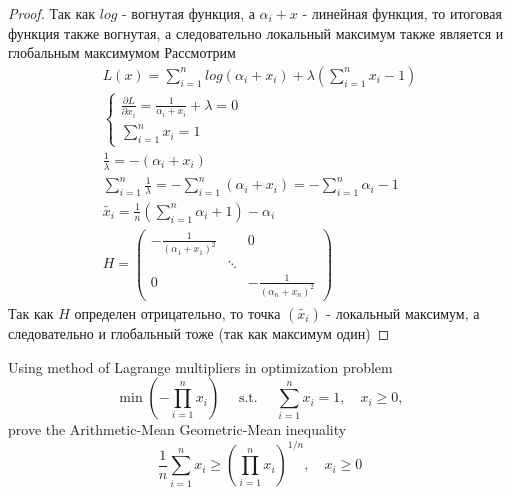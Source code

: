 \begin{proof}
    Так как $log$ - вогнутая функция, а $\alpha_i + x$ - линейная функция, то итоговая функция также вогнутая, а следовательно локальный максимум также является и глобальным максимумом
    Рассмотрим
    \begin{gather*}
        L(x) = \sum\limits_{i=1}^{n} log(\alpha_i + x_i) + \lambda (\sum\limits_{i=1}^{n} x_i - 1)\\
        \begin{cases}
            \frac{\partial L}{\partial x_i} = \frac{1}{\alpha_i + x_i} + \lambda = 0\\
            \sum\limits_{i = 1}^{n} x_i = 1
        \end{cases}\\
        \frac{1}{\lambda} = -(\alpha_i + x_i)\\
        \sum\limits_{i = 1}^{n} \frac{1}{\lambda}
        = -\sum\limits_{i = 1}^{n} (\alpha_i + x_i)
        = -\sum\limits_{i = 1}^{n} \alpha_i - 1\\
        \tilde{x_i} = \frac{1}{n}(\sum\limits_{i = 1}^{n} \alpha_i + 1) - \alpha_i\\
        H =
        \begin{pmatrix}
            -\frac{1}{(\alpha_1 + x_1)^2} & & 0\\
            & \ddots &\\
            0 & & -\frac{1}{(\alpha_n + x_n)^2}
        \end{pmatrix}
    \end{gather*}
    Так как $H$ определен отрицательно, то точка $(\tilde{x_i})$ - локальный максимум, а следовательно и глобальный тоже (так как максимум один)
\end{proof}
\vskip 0.4in





\begin{prob}
    Using method of Lagrange multipliers in optimization problem
    $$
    \min \left(-\prod_{i=1}^n x_i\right) \quad \text { s.t. } \quad \sum_{i=1}^n x_i=1, \quad x_i \geq 0,
    $$
    prove the Arithmetic-Mean Geometric-Mean inequality
    $$
    \frac{1}{n} \sum_{i=1}^n x_i \geq\left(\prod_{i=1}^n x_i\right)^{1 / n}, \quad x_i \geq 0
    $$
\end{prob}

